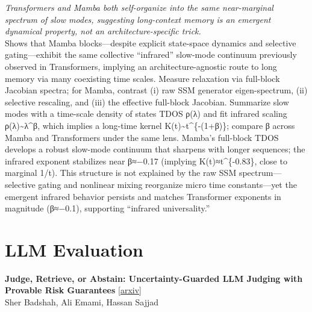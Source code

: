 \documentclass[12pt,letterpaper]{article}
\begin{document}
{\small\textit{Transformers and Mamba both self-organize into the same near-marginal spectrum of slow modes, suggesting long-context memory is an emergent dynamical property, not an architecture-specific trick.}}\\[1pt]
{\footnotesize Shows that Mamba blocks---despite explicit state-space dynamics and selective gating---exhibit the same collective ``infrared'' slow-mode continuum previously observed in Transformers, implying an architecture-agnostic route to long memory via many coexisting time scales. Measure relaxation via full-block Jacobian spectra; for Mamba, contrast (i) raw SSM generator eigen-spectrum, (ii) selective rescaling, and (iii) the effective full-block Jacobian. Summarize slow modes with a time-scale density of states TDOS ρ(λ) and fit infrared scaling ρ(λ)\textasciitilde{}λ\textasciicircum{}β, which implies a long-time kernel K(t)\textasciitilde{}t\textasciicircum{}\{-(1+β)\}; compare β across Mamba and Transformers under the same lens. Mamba's full-block TDOS develops a robust slow-mode continuum that sharpens with longer sequences; the infrared exponent stabilizes near β≈−0.17 (implying K(t)≈t\textasciicircum{}\{-0.83\}, close to marginal 1/t). This structure is not explained by the raw SSM spectrum---selective gating and nonlinear mixing reorganize micro time constants---yet the emergent infrared behavior persists and matches Transformer exponents in magnitude (β≈−0.1), supporting ``infrared universality.''}

\medskip


\section*{LLM Evaluation}

{\small\textbf{Judge, Retrieve, or Abstain: Uncertainty-Guarded LLM Judging with Provable Risk Guarantees}} {\scriptsize[\href{https://arxiv.org/abs/2608.17994}{arxiv}]}\\
{\scriptsize Sher Badshah, Ali Emami, Hassan Sajjad}\\
\end{document}
